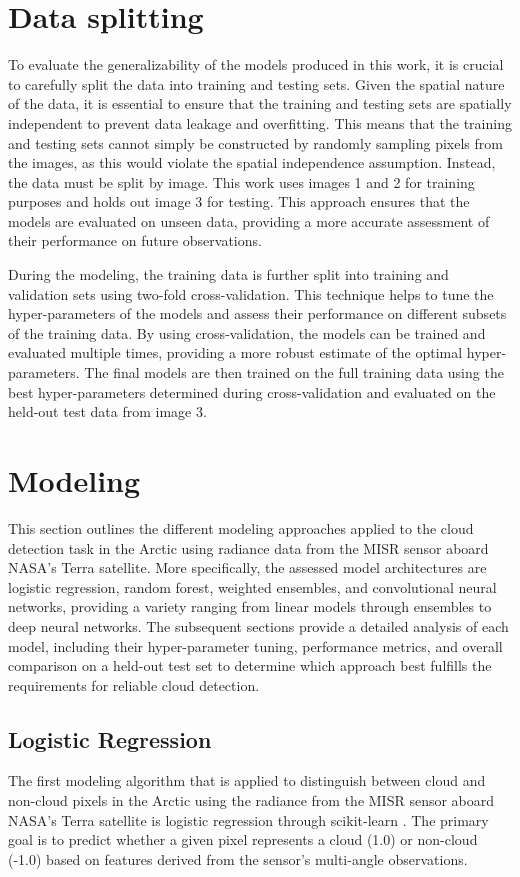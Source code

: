 \documentclass[11pt,letterpaper]{article}
\begin{document}
\section{Data splitting}
To evaluate the generalizability of the models produced in this work, it is crucial to carefully split the data into training and testing sets. Given the spatial nature of the data, it is essential to ensure that the training and testing sets are spatially independent to prevent data leakage and overfitting. This means that the training and testing sets cannot simply be constructed by randomly sampling pixels from the images, as this would violate the spatial independence assumption. Instead, the data must be split by image. This work uses images 1 and 2 for training purposes and holds out image 3 for testing. This approach ensures that the models are evaluated on unseen data, providing a more accurate assessment of their performance on future observations.

During the modeling, the training data is further split into training and validation sets using two-fold cross-validation. This technique helps to tune the hyper-parameters of the models and assess their performance on different subsets of the training data. By using cross-validation, the models can be trained and evaluated multiple times, providing a more robust estimate of the optimal hyper-parameters. The final models are then trained on the full training data using the best hyper-parameters determined during cross-validation and evaluated on the held-out test data from image 3.

\section{Modeling}
This section outlines the different modeling approaches applied to the cloud detection task in the Arctic using radiance data from the MISR sensor aboard NASA's Terra satellite. More specifically, the assessed model architectures are logistic regression, random forest, weighted ensembles, and convolutional neural networks, providing a variety ranging from linear models through ensembles to deep neural networks. The subsequent sections provide a detailed analysis of each model, including their hyper-parameter tuning, performance metrics, and overall comparison on a held-out test set to determine which approach best fulfills the requirements for reliable cloud detection.

\subsection{Logistic Regression}
The first modeling algorithm that is applied to distinguish between cloud and non-cloud pixels in the Arctic using the radiance from the MISR sensor aboard NASA's Terra satellite is logistic regression through scikit-learn \parencite[]{scikit-learn}. The primary goal is to predict whether a given pixel represents a cloud (1.0) or non-cloud (-1.0) based on features derived from the sensor's multi-angle observations.
\end{document}
